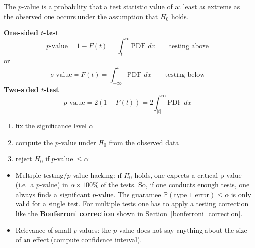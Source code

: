 The $p$-value is a probability that a test statistic value of at least as extreme as the observed one occurs under the assumption that $H_0$ holds.

\textbf{One-sided $t$-test}
\begin{equation*}
    p\text{-value} = 1-F(t) = \int_{t}^{\infty}\text{PDF }dx \qquad \text{testing above}
\end{equation*}
or
\begin{equation*}
    p\text{-value} = F(t) = \int_{-\infty}^{t}\text{PDF }dx \qquad \text{testing below}
\end{equation*}
\textbf{Two-sided $t$-test}
\begin{equation*}
    p\text{-value} = 2(1-F(t)) =  2\int_{|t|}^{\infty}\text{PDF }dx
\end{equation*}

\newpar{}
\begin{enumerate}
    \item fix the significance level $\alpha$
    \item compute the $p$-value under $H_0$ from the observed data
    \item reject $H_0$ if $p$-value $\leq \alpha$
\end{enumerate}

\newpar{}

\begin{itemize}
    \item Multiple testing/$p$-value hacking: if $H_0$ holds, one expects a critical p-value (i.e.\ a $p$-value) in $\alpha \times 100\%$ of the tests. So, if one conducts enough tests, one always finds a significant $p$-value. The guarantee $\mathbb{P}(\text{type 1 error}) \leq \alpha$ is only valid for a single test. For multiple tests one has to apply a testing correction like the \textbf{Bonferroni correction} shown in Section~\ref{bonferroni_correction}.
    \item Relevance of small $p$-values: the $p$-value does not say anything about the size of an effect (compute confidence interval).
\end{itemize}


